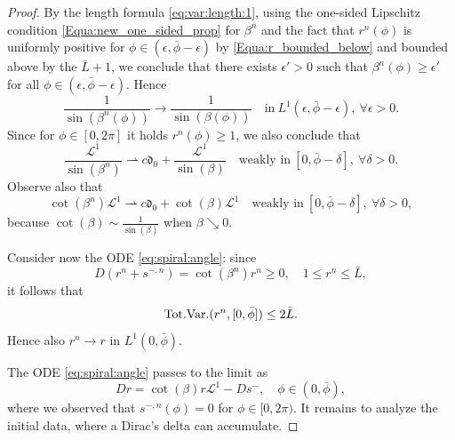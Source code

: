 \documentclass[reqno]{amsart}
\theoremstyle{definition} \newtheorem{definition}{Definition}[section]
\theoremstyle{definition} \newtheorem{remark}[definition]{Remark}
\theoremstyle{plain} \newtheorem{lemma}[definition]{Lemma}
\theoremstyle{plain} \newtheorem{proposition}[definition]{Proposition}
\theoremstyle{plain} \newtheorem{theorem}[definition]{Theorem}
\theoremstyle{plain} \newtheorem{corollary}[definition]{Corollary}
\theoremstyle{definition} \newtheorem{example}[definition]{Example}
\theoremstyle{plain} \newtheorem{claim}[clai]{Claim}
\theoremstyle{definition} \newtheorem{assumption}[definition]{Assumption}
\theoremstyle{definition} \newtheorem{observation}[definition]{Observation}
\newcommand{\TV}{\text{\rm Tot.Var.}}
\newcommand{\1}{\mathbbm 1}
\newcommand{\Diracd}{\mathfrak{d}}
\numberwithin{equation}{section} %
\theoremstyle{plain} \newtheorem*{theorem*}{Theorem}
\theoremstyle{plain} \newtheorem{mthm}[maintheorem]{Main Theorem}
\theoremstyle{plain} \newtheorem*{mthm*}{Main Theorem}
\theoremstyle{plain} \newtheorem*{conjecture*}{Conjecture}
\theoremstyle{plain} \newtheorem{conjecture}[definition]{Conjecture}
\theoremstyle{plain} \newtheorem*{problem*}{Problem}
\begin{document}
\begin{proof}
 By the length formula \eqref{eq:var:length:1}, using the one-sided Lipschitz condition \eqref{Equa:new_one_sided_prop} for $\beta^n$ and the fact that $r^n(\phi)$ is uniformly positive for $\phi \in (\epsilon,{\bar \phi} -\epsilon)$ by \eqref{Equa:r_bounded_below} and bounded above by the $\bar L + 1$, we conclude that there exists $\epsilon' > 0$ such that $\beta^n(\phi) \geq \epsilon'$ for all $\phi \in (\epsilon,{\bar \phi} - \epsilon)$. Hence
\begin{equation*}
\frac{1}{\sin(\beta^n(\phi))} \to \frac{1}{\sin(\beta(\phi))} \quad \text{in} \ L^1(\epsilon,{\bar \phi} - \epsilon), \ \forall \epsilon > 0.
\end{equation*}
Since for $\phi \in [0,2\pi]$ it holds $r^n(\phi) \geq 1$, we also conclude that
\begin{equation*}
\frac{\mathscr L^1}{\sin(\beta^n)} \rightharpoonup c \Diracd_0 + \frac{\mathscr L^1}{\sin(\beta)} \quad \text{weakly in} \ [0,{\bar \phi} - \delta], \ \forall \delta > 0.
\end{equation*}
Observe also that
\begin{equation*}
\cot(\beta^n) \mathscr L^1 \rightharpoonup c \Diracd_0 + \cot(\beta) \mathscr L^1 \quad \text{weakly in} \ [0,{\bar \phi} - \delta], \ \forall \delta > 0,
\end{equation*}
because $\cot(\beta) \sim \frac{1}{\sin(\beta)}$ when $\beta \searrow 0$.

\medskip

 Consider now the ODE \eqref{eq:spiral:angle}: since
\begin{equation*}
D(r^n + s^{-,n}) = \cot(\beta^n) r^n \geq 0, \quad 1 \leq r^n \leq \bar L,
\end{equation*}
it follows that
%
\begin{equation*}
\TV(r^n,[0,{\bar \phi}]) \leq 2\bar L.
\end{equation*}
Hence also $r^n \to r$ in $L^1(0,{\bar \phi})$.

\medskip

 The ODE \eqref{eq:spiral:angle} passes to the limit as
\begin{equation*}
Dr = \cot(\beta) r \mathscr L^1 - Ds^-, \quad \phi \in (0,{\bar \phi}),
\end{equation*}
where we observed that $s^{-,n}(\phi) = 0$ for $\phi \in [0,2\pi)$. It remains to analyze the initial data, where a Dirac's delta can accumulate.


\end{proof}
\end{document}
